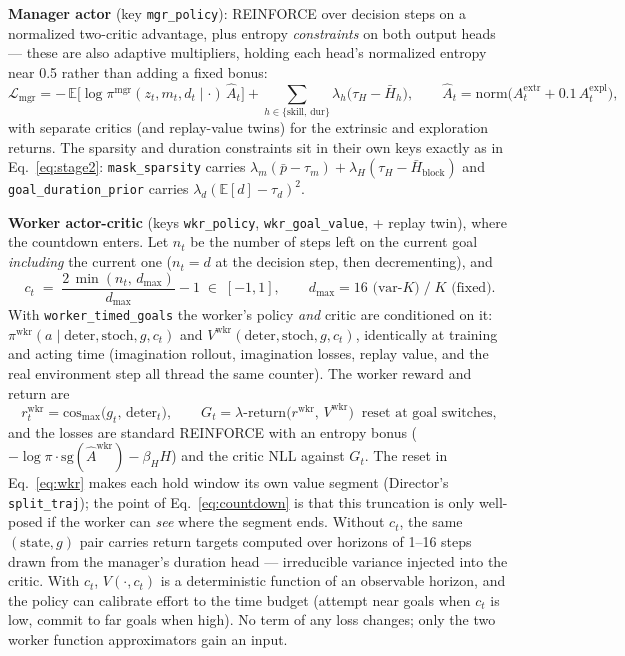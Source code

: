 \documentclass[10pt]{article}
\begin{document}
\textbf{Manager actor} (key \texttt{mgr\_policy}): REINFORCE over decision
steps on a normalized two-critic advantage, plus entropy \emph{constraints}
on both output heads --- these are also adaptive multipliers, holding each
head's normalized entropy near 0.5 rather than adding a fixed bonus:
\begin{equation}
\mathcal{L}_{\text{mgr}} = -\,\mathbb{E}\Big[\log \pi^{\text{mgr}}(z_t, m_t, d_t \mid \cdot)\,
\hat A_t\Big]
+ \!\!\sum_{h \in \{\text{skill},\,\text{dur}\}}\!\! \lambda_h\big(\tau_{\!H} - \bar H_h\big),
\qquad
\hat A_t = \mathrm{norm}\big(A^{\text{extr}}_t + 0.1\,A^{\text{expl}}_t\big),
\label{eq:mgr}
\end{equation}
with separate critics (and replay-value twins) for the extrinsic and
exploration returns. The sparsity and duration constraints sit in their own
keys exactly as in Eq.~\eqref{eq:stage2}: \texttt{mask\_sparsity} carries
$\lambda_m(\bar p - \tau_m) + \lambda_H(\tau_H - \bar H_{\text{block}})$ and
\texttt{goal\_duration\_prior} carries $\lambda_d(\mathbb{E}[d]-\tau_d)^2$.

\textbf{Worker actor-critic} (keys \texttt{wkr\_policy},
\texttt{wkr\_goal\_value}, + replay twin), where the countdown enters. Let
$n_t$ be the number of steps left on the current goal \emph{including} the
current one ($n_t = d$ at the decision step, then decrementing), and
\begin{equation}
c_t \;=\; \frac{2\,\min(n_t,\,d_{\max})}{d_{\max}} - 1 \;\in\; [-1, 1],
\qquad d_{\max} = 16 \text{ (var-}K\text{)} \;/\; K \text{ (fixed)} .
\label{eq:countdown}
\end{equation}
With \texttt{worker\_timed\_goals} the worker's policy \emph{and} critic are
conditioned on it: $\pi^{\text{wkr}}(a \mid \text{deter}, \text{stoch}, g,
c_t)$ and $V^{\text{wkr}}(\text{deter}, \text{stoch}, g, c_t)$, identically
at training and acting time (imagination rollout, imagination losses, replay
value, and the real environment step all thread the same counter). The
worker reward and return are
\begin{equation}
r^{\text{wkr}}_t = \operatorname{cos_{max}}\!\big(g_t,\, \text{deter}_t\big),
\qquad
G_t = \text{$\lambda$-return}\big(r^{\text{wkr}},\, V^{\text{wkr}}\big)
\;\;\text{reset at goal switches},
\label{eq:wkr}
\end{equation}
and the losses are standard REINFORCE with an entropy bonus
($-\log\pi\cdot\mathrm{sg}(\hat A^{\text{wkr}}) - \beta_H H$) and the critic
NLL against $G_t$. The reset in Eq.~\eqref{eq:wkr} makes each hold window
its own value segment (Director's \texttt{split\_traj}); the point of
Eq.~\eqref{eq:countdown} is that this truncation is only well-posed if the
worker can \emph{see} where the segment ends. Without $c_t$, the same
$(\text{state}, g)$ pair carries return targets computed over horizons of
1--16 steps drawn from the manager's duration head --- irreducible variance
injected into the critic. With $c_t$, $V(\cdot, c_t)$ is a deterministic
function of an observable horizon, and the policy can calibrate effort to
the time budget (attempt near goals when $c_t$ is low, commit to far goals
when high). No term of any loss changes; only the two worker function
approximators gain an input.
\end{document}
